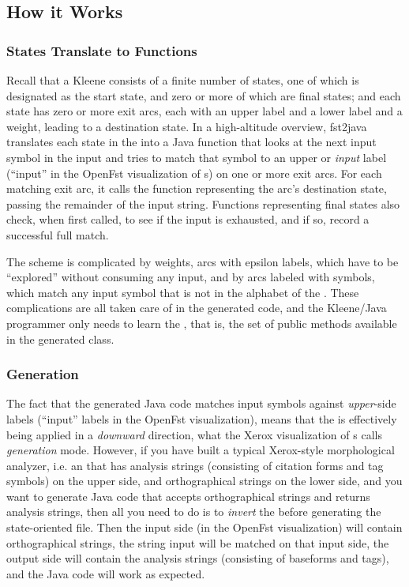 \subsection{How it Works}

\subsubsection{States Translate to Functions}

Recall that a Kleene \fsm{} consists of a finite number of states, one of which is designated as
the start state, and zero or more of which are final states; and each state has zero or more exit
arcs, each with an upper label and a lower label and a weight, leading to a destination state.  In a
high-altitude overview, fst2java translates each state in the \fsm{} into a Java function that
looks at the next input symbol in the input and tries to match that symbol to an upper or
\emph{input} label (``input'' in the OpenFst visualization of \fsm{}s) on one or more exit arcs.
For each matching exit arc, it calls the function representing the arc's destination state, passing
the remainder of the input string.  Functions representing final states also check, when first
called, to see if the input is exhausted, and if so, record a successful full match.

The scheme is complicated by weights, arcs with epsilon labels, which have to be ``explored''
without consuming any input, and by arcs labeled with  symbols, which match
any input symbol that is not in the alphabet of the \fsm{}.  These complications are all
taken care of in the generated code, and the Kleene/Java programmer only needs to learn
the , that is, the set of public methods available in the
generated class.

\subsubsection{Generation}

The fact that the generated Java code matches input symbols against \emph{upper}-side labels
(``input'' labels in the OpenFst visualization), means that the \fsm{} is effectively being applied
in a \emph{downward} direction, what the Xerox visualization of \fsm{}s calls \emph{generation}
mode.  However, if you have built a typical Xerox-style \fst{} morphological analyzer, i.e.\@
an \fst{} that has analysis strings (consisting of citation forms and tag symbols) on the upper side,
and orthographical strings on the lower side, and you want to generate Java code that accepts
orthographical strings and returns analysis strings, then all you need to do is to \emph{invert}
the \fst{} before generating the state-oriented  file.  Then the input side (in the
OpenFst visualization) will contain orthographical strings, the string input will be matched on
that input side, the output side will contain the analysis strings (consisting of baseforms
and tags), and the Java code will work as expected.

